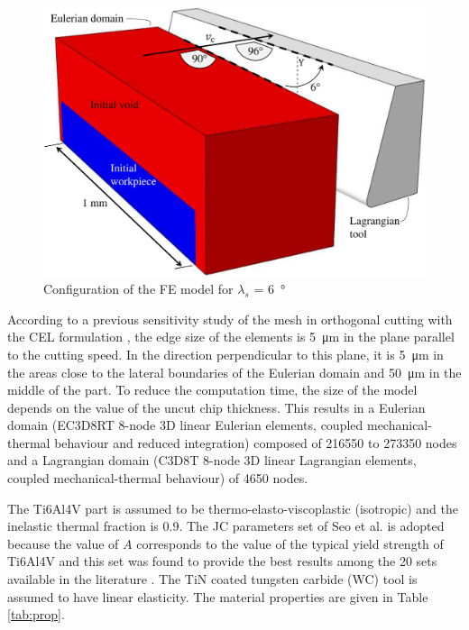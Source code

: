 \documentclass[preprint,12pt,times]{elsarticle}
\begin{document}
\begin{figure}[!h]
\centering
\includegraphics[width = 140 mm]{Figures/FEConfig}
\caption{Configuration of the FE model for $\lambda_s$ = \qty{6}{\degree}}
\label{fig:FEConfig}
\end{figure}

According to a previous sensitivity study of the mesh in orthogonal cutting with the CEL formulation \cite{ducobu_Finite_2017}, the edge size of the elements is \qty{5}{\um} in the plane parallel to the cutting speed. In the direction perpendicular to this plane, it is \qty{5}{\um} in the areas close to the lateral boundaries of the Eulerian domain and \qty{50}{\um} in the middle of the part. To reduce the computation time, the size of the model depends on the value of the uncut chip thickness. This results in a Eulerian domain (EC3D8RT 8-node 3D linear Eulerian elements, coupled mechanical-thermal behaviour and reduced integration) composed of \num{216550} to \num{273350} nodes and a Lagrangian domain (C3D8T 8-node 3D linear Lagrangian elements, coupled mechanical-thermal behaviour) of \num{4650} nodes.

The Ti6Al4V part is assumed to be thermo-elasto-viscoplastic (isotropic) and the inelastic thermal fraction is 0.9. The JC parameters set of Seo et al. \cite{seo_Constitutive_2005} is adopted because the value of $A$ corresponds to the value of the typical yield strength of Ti6Al4V and this set was found to provide the best results among the 20 sets available in the literature \cite{ducobu_Importance_2017}.  The TiN coated tungsten carbide (WC) tool is assumed to have linear elasticity. The material properties are given in Table \ref{tab:prop}.
\end{document}
